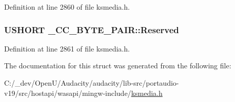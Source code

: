 Definition at line 2860 of file ksmedia.\+h.

\subsubsection[{\texorpdfstring{Reserved}{Reserved}}]{\setlength{\rightskip}{0pt plus 5cm}U\+S\+H\+O\+RT \+\_\+\+C\+C\+\_\+\+B\+Y\+T\+E\+\_\+\+P\+A\+I\+R\+::\+Reserved}\hypertarget{struct___c_c___b_y_t_e___p_a_i_r_aa9468f0020461de0ee1d48925e248978}{}\label{struct___c_c___b_y_t_e___p_a_i_r_aa9468f0020461de0ee1d48925e248978}


Definition at line 2861 of file ksmedia.\+h.



The documentation for this struct was generated from the following file\+:\begin{DoxyCompactItemize}
\item 
C\+:/\+\_\+dev/\+Open\+U/\+Audacity/audacity/lib-\/src/portaudio-\/v19/src/hostapi/wasapi/mingw-\/include/\hyperlink{ksmedia_8h}{ksmedia.\+h}\end{DoxyCompactItemize}
